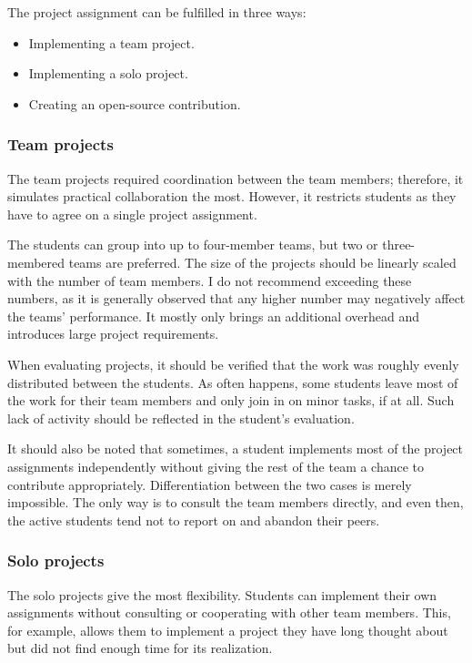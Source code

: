 \documentclass[
  digital,
  color,
  oneside,
  nosansbold,
  nocolorbold,
  lof,
  nolot,
]{fithesis4}
\begin{document}
The project assignment can be fulfilled in three ways:
\begin{itemize}
 \item Implementing a team project.
 \item Implementing a solo project.
 \item Creating an open-source contribution.
\end{itemize}

\subsubsection{Team projects}

The team projects required coordination between the team members; therefore, it simulates practical collaboration the most. However, it restricts students as they have to agree on a single project assignment. 

The students can group into up to four-member teams, but two or three-membered teams are preferred. The size of the projects should be linearly scaled with the number of team members. I do not recommend exceeding these numbers, as it is generally observed that any higher number may negatively affect the teams' performance. It mostly only brings an additional overhead and introduces large project requirements.

When evaluating projects, it should be verified that the work was roughly evenly distributed between the students. As often happens, some students leave most of the work for their team members and only join in on minor tasks, if at all. Such lack of activity should be reflected in the student's evaluation.

It should also be noted that sometimes, a student implements most of the project assignments independently without giving the rest of the team a chance to contribute appropriately. Differentiation between the two cases is merely impossible. The only way is to consult the team members directly, and even then, the active students tend not to report on and abandon their peers.

\subsubsection{Solo projects}

The solo projects give the most flexibility. Students can implement their own assignments without consulting or cooperating with other team members. This, for example, allows them to implement a project they have long thought about but did not find enough time for its realization.
\end{document}

